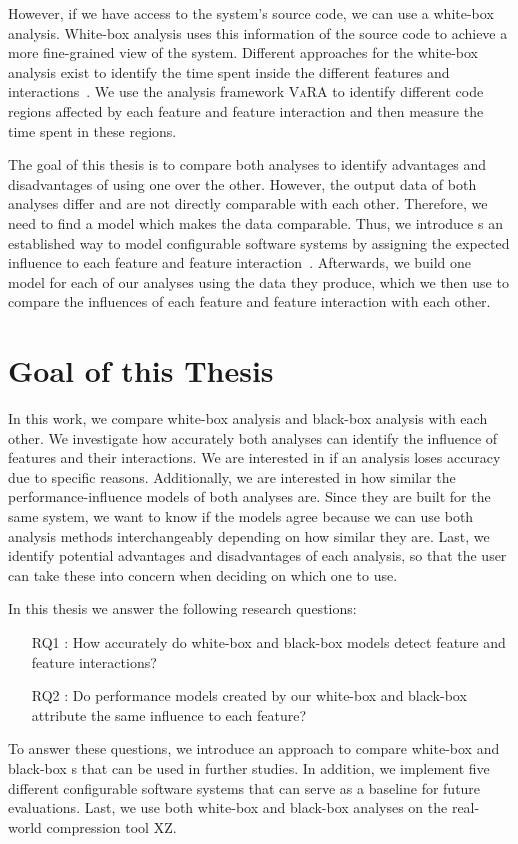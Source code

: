 However, if we have access to the system's source code, we can use a white-box analysis. 
White-box analysis uses this information of the source code to achieve a more fine-grained view of the system. 
Different approaches for the white-box analysis exist to identify the time spent inside the different features and interactions~\cite{Comprex, ConfigCrusher}.
We use the analysis framework \textsc{VaRA} to identify different code regions affected by each feature and feature interaction and then
measure the time spent in these regions.

The goal of this thesis is to compare both analyses to identify advantages and disadvantages of using one over the other. 
However, the output data of both analyses differ and are not directly comparable with each other.
Therefore, we need to find a model which makes the data comparable. 
Thus, we introduce {\perfInfluenceModel}s an established way to model configurable software systems by assigning the expected influence to each feature 
and feature interaction~\cite{Performance-influence-models-for-highly-configurable-systems}. 
Afterwards, we build one model for each of our analyses using the data they produce, which we then use to compare the influences of each feature
and feature interaction with each other.

\section{Goal of this Thesis}
In this work, we compare white-box analysis and black-box analysis with each other. 
We investigate how accurately both analyses can identify the influence of features and their interactions.
We are interested in if an analysis loses accuracy due to specific reasons.
Additionally, we are interested in how similar the performance-influence models of both analyses are. 
Since they are built for the same system, we want to know if the models agree because we can use both analysis 
methods interchangeably depending on how similar they are.
Last, we identify potential advantages and disadvantages of each analysis, so that the user can take these into concern when deciding on which 
one to use.

In this thesis we answer the following research questions:

\begin{itemize}\label{researchQuestions}
    \item[RQ1]: How accurately do white-box and black-box models detect feature and feature interactions? 
    \item[RQ2]: Do performance models created by our white-box and black-box attribute the same influence to each feature?
\end{itemize}

To answer these questions, we introduce an approach to compare white-box and black-box {\perfInfluenceModel}s that can be used in further studies.
In addition, we implement five different configurable software systems that can serve as a baseline for future evaluations.
Last, we use both white-box and black-box analyses on the real-world compression tool \textsc{XZ}. 
